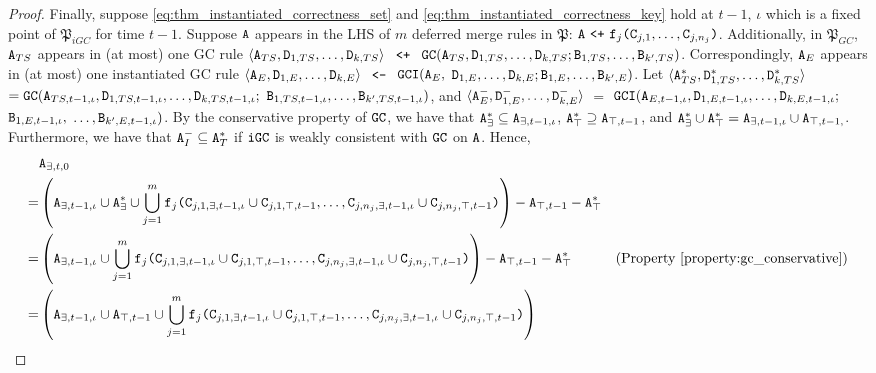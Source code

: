 \begin{proof}
Finally, suppose \eqref{eq:thm_instantiated_correctness_set} and \eqref{eq:thm_instantiated_correctness_key} hold at $t-1$, $\iota$ which is a fixed point of $\mathfrak{P}_{iGC}$ for time $t-1$.
Suppose $\tt{A}$ appears in the LHS of $m$ deferred merge rules in $\mathfrak{P}$: $\tt{A} ~\tt{<+}~ \tt{f}_j\tt{(}\tt{C}_{j,1},\dots,\tt{C}_{j,n_j}\tt{)}$.
Additionally, in $\mathfrak{P}_{GC}$, $\tt{A}_{TS}$ appears in (at most) one GC rule $\langle \tt{A}_{TS}, \tt{D}_{1,TS}, \dots, \tt{D}_{k,TS} \rangle$ $~\tt{<+}~$ $\tt{GC}(\tt{A}_{TS}, \tt{D}_{1,TS}, \dots, \tt{D}_{k,TS}; \tt{B}_{1,TS}, \dots, \tt{B}_{k',TS})$.
Correspondingly, $\tt{A}_E$ appears in (at most) one instantiated GC rule $\langle \tt{A}_E, \tt{D}_{1,E}, \dots, \tt{D}_{k,E} \rangle$ $~\tt{<-}~$ $\tt{GCI}(\tt{A}_{E},$ $\tt{D}_{1,E}, \dots, \tt{D}_{k,E}; \tt{B}_{1,E}, \dots, \tt{B}_{k',E})$.
Let $\langle \tt{A}_{TS}^*, \tt{D}_{1,TS}^*, \dots, \tt{D}_{k,TS}^* \rangle$ $= \tt{GC}(\tt{A}_{TS,t-1,\iota}, \tt{D}_{1,TS,t-1,\iota}, \dots, \tt{D}_{k,TS,t-1,\iota};$ $\tt{B}_{1,TS,t-1,\iota}, \dots, \tt{B}_{k',TS,t-1,\iota})$, and
$\langle \tt{A}_E^-, \tt{D}_{1,E}^-, \dots, \tt{D}_{k,E}^- \rangle$ $=$ $\tt{GCI}(\tt{A}_{E,t-1,\iota}, \tt{D}_{1,E,t-1,\iota}, \dots, \tt{D}_{k,E,t-1,\iota};$ $\tt{B}_{1,E,t-1,\iota},$ $\dots, \tt{B}_{k',E,t-1,\iota})$.
By the conservative property of $\tt{GC}$, we have that $\tt{A}_{\exists}^* \subseteq \tt{A}_{\exists,t-1,\iota}$, $\tt{A}_{\top}^* \supseteq \tt{A}_{\top,t-1}$, and $\tt{A}_{\exists}^* \cup \tt{A}_{\top}^* = \tt{A}_{\exists,t-1,\iota} \cup \tt{A}_{\top,t-1,}$.
Furthermore, we have that $\tt{A}_I^- \subseteq \tt{A}_{T}^*$ if $\tt{iGC}$ is weakly consistent with $\tt{GC}$ on $\tt{A}$.
Hence,
\begin{align}
&\tt{A}_{\exists,t,0}\nonumber\\
=& \left(\tt{A}_{\exists,t-1,\iota} \cup \tt{A}_\exists^* \cup \bigcup_{j=1}^m \tt{f}_j\tt{(}\tt{C}_{j,1,\exists,t-1,\iota} \cup \tt{C}_{j,1,\top,t-1}, \dots, \tt{C}_{j,n_j,\exists,t-1,\iota} \cup \tt{C}_{j,n_j,\top,t-1}\tt{)}\right)
- \tt{A}_{\top,t-1} - \tt{A}_\top^*\nonumber\\
=& \left(\tt{A}_{\exists,t-1,\iota} \cup \bigcup_{j=1}^m \tt{f}_j\tt{(}\tt{C}_{j,1,\exists,t-1,\iota} \cup \tt{C}_{j,1,\top,t-1}, \dots, \tt{C}_{j,n_j,\exists,t-1,\iota} \cup \tt{C}_{j,n_j,\top,t-1}\tt{)}\right)
- \tt{A}_{\top,t-1} - \tt{A}_\top^* & \text{(Property \ref{property:gc_conservative})}\nonumber\\
=& \left(\tt{A}_{\exists,t-1,\iota} \cup \tt{A}_{\top,t-1} \cup \bigcup_{j=1}^m \tt{f}_j\tt{(}\tt{C}_{j,1,\exists,t-1,\iota} \cup \tt{C}_{j,1,\top,t-1}, \dots, \tt{C}_{j,n_j,\exists,t-1,\iota} \cup \tt{C}_{j,n_j,\top,t-1}\tt{)}\right)

\end{align}
\end{proof}
